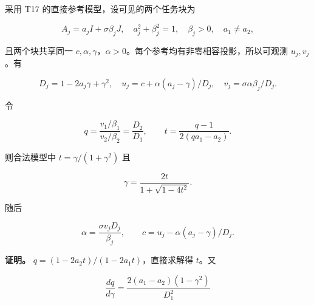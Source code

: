 \documentclass[11pt,a4paper]{article}
\begin{document}
\par
\noindent\begin{minipage}{\linewidth}

采用 T17 的直接参考模型，设可见的两个任务块为

\[
A_j=a_jI+\sigma\beta_jJ,\quad
a_j^2+\beta_j^2=1,\quad\beta_j>0,\quad a_1\ne a_2,
\]

\end{minipage}\par

\par
\noindent\begin{minipage}{\linewidth}

且两个块共享同一
\(c,\alpha,\gamma\)，\(\alpha>0\)。每个参考均有非零相容投影，所以可观测
\(u_j,v_j\)。有

\[
D_j=1-2a_j\gamma+\gamma^2,\quad
u_j=c+\alpha(a_j-\gamma)/D_j,\quad
v_j=\sigma\alpha\beta_j/D_j.
\]

\end{minipage}\par

\par
\noindent\begin{minipage}{\linewidth}

令

\[
q=\frac{v_1/\beta_1}{v_2/\beta_2}=\frac{D_2}{D_1},
\qquad
t=\frac{q-1}{2(qa_1-a_2)}.
\]

\end{minipage}\par

\par
\noindent\begin{minipage}{\linewidth}

则合法模型中 \(t=\gamma/(1+\gamma^2)\) 且

\[
\boxed{\gamma=\frac{2t}{1+\sqrt{1-4t^2}}.}
\]

\end{minipage}\par

\par
\noindent\begin{minipage}{\linewidth}

随后

\[
\alpha=\frac{\sigma v_jD_j}{\beta_j},\qquad
c=u_j-\alpha(a_j-\gamma)/D_j.
\]

\end{minipage}\par

\par
\noindent\begin{minipage}{\linewidth}

\textbf{证明。} \(q=(1-2a_2t)/(1-2a_1t)\)，直接求解得 \(t\)。又

\[
\frac{dq}{d\gamma}
=\frac{2(a_1-a_2)(1-\gamma^2)}{D_1^2}
\]

\end{minipage}\par
\end{document}
